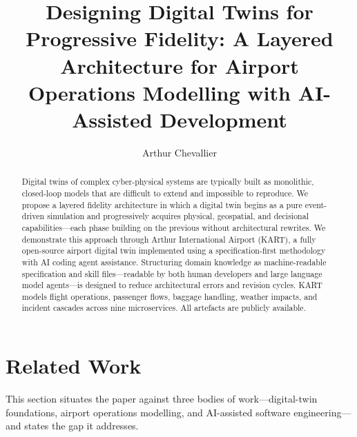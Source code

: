 \documentclass[runningheads]{llncs}
\begin{document}
%
\title{Designing Digital Twins for Progressive Fidelity: A Layered Architecture for Airport Operations Modelling with AI-Assisted Development}
%
%
\author{Arthur Chevallier}
%
%
%
\maketitle              %
%
\begin{abstract}
Digital twins of complex cyber-physical systems are typically built as monolithic, closed-loop models that are difficult to extend and impossible to reproduce. We propose a layered fidelity architecture in which a digital twin begins as a pure event-driven simulation and progressively acquires physical, geospatial, and decisional capabilities---each phase building on the previous without architectural rewrites. We demonstrate this approach through Arthur International Airport (KART), a fully open-source airport digital twin implemented using a specification-first methodology with AI coding agent assistance. Structuring domain knowledge as machine-readable specification and skill files---readable by both human developers and large language model agents---is designed to reduce architectural errors and revision cycles. KART models flight operations, passenger flows, baggage handling, weather impacts, and incident cascades across nine microservices. All artefacts are publicly available.

\end{abstract}
%
%
%


\section{Related Work}\label{sec:related}

This section situates the paper against three bodies of work---digital-twin foundations, airport operations modelling, and AI-assisted software engineering---and states the gap it addresses.
\end{document}
